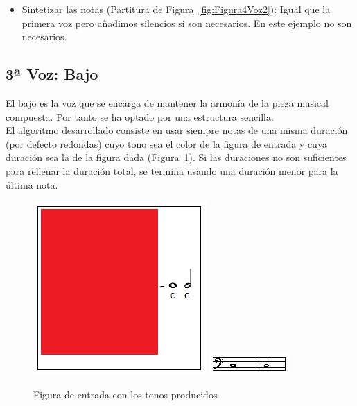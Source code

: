 \begin{itemize}
	\item Sintetizar las notas (Partitura de Figura~\ref{fig:Figura4Voz2}): Igual que la primera voz pero añadimos silencios si son necesarios. En este ejemplo no son necesarios.

\end{itemize}


\subsection{3ª Voz: Bajo}

El bajo es la voz que se encarga de mantener la armonía de la pieza musical compuesta. Por tanto se ha optado por una estructura sencilla. \\

El algoritmo desarrollado consiste en usar siempre notas de una misma duración (por defecto redondas) cuyo tono sea el color de la figura de entrada y cuya duración sea la de la figura dada (Figura~\ref{fig:Figura1Voz3}). Si las duraciones no son suficientes para rellenar la duración total, se termina usando una duración menor para la última nota. \\

		\begin{figure}[!htbp]
		\centering
		\hspace*{0.0in}
		\includegraphics[scale=1]{graphics/simpletest2-F2F3.png}
		\includegraphics[scale=1]{graphics/simpletest2-BASSpartitura.png}
		\caption{Figura de entrada con los tonos producidos}
		\label{fig:Figura1Voz3}
		\end{figure}


